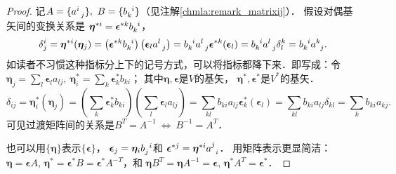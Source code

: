\begin{proof}
    记$A=\{a^{i}_{\hphantom{a} j}\},\ B=\{b^{\hphantom{a} i} _k\}$（见注解\ref{chmla:remark_matrixij}）．
    假设对偶基矢间的变换关系是
    $\boldsymbol{\eta}^{*i} = \boldsymbol{\epsilon}^{*k} b^{\hphantom{a} i} _k $，
    \begin{equation}\label{chmla:eqn_inv-cov-base}
        \delta^i _j = \boldsymbol{\eta}^{*i}(\boldsymbol{\eta}_j) =
        \left( \boldsymbol{\epsilon}^{*k} b^{\hphantom{a} i} _k \right)
        \left( \boldsymbol{\epsilon}_l a^{l}_{\hphantom{a} j}  \right) =
        b^{\hphantom{a} i} _k   a^{l}_{\hphantom{a} j}
        \boldsymbol{\epsilon}^{*k}(\boldsymbol{\epsilon}_l) =
        b^{\hphantom{a} i} _k   a^{l}_{\hphantom{a} j}  \delta^k_l =
        b^{\hphantom{a} i} _k   a^{k}_{\hphantom{a} j}.
    \end{equation}
    如读者不习惯这种指标分上下的记号方式，可以将指标都降下来．即写成：令
    $\boldsymbol{\eta}_j = \sum_{l}\boldsymbol{\epsilon}_l a_{lj},\
    \boldsymbol{\eta}^{*}_i =\sum_{k} \boldsymbol{\epsilon}^{*}_k b_{ki}$；
    其中$\boldsymbol{\eta},\boldsymbol{\epsilon}$是$V$的基矢，
    $\boldsymbol{\eta}^{*},\boldsymbol{\epsilon}^{*}$是$V^*$的基矢．
\setlength{\mathindent}{0em}
    \begin{equation*}
        \delta_{ij} = \boldsymbol{\eta}^{*}_i(\boldsymbol{\eta}_j) =
        \left( \sum_{k} \boldsymbol{\epsilon}^{*}_k b_{ki} \right)
        \left( \sum_{l} \boldsymbol{\epsilon}_l a_{lj} \right) =
        \sum_{kl} b_{ki}  a_{lj}
        \boldsymbol{\epsilon}^{*}_k(\boldsymbol{\epsilon}_l) =
        \sum_{kl} b_{ki}  a_{lj}  \delta_{kl} =
        \sum_{k} b_{ki}  a_{kj}.
    \end{equation*}\setlength{\mathindent}{2em}
    可见过渡矩阵间的关系是$B^T=A^{-1} \ \Leftrightarrow \ B^{-1} = A^T$．

    也可以用$\{\boldsymbol{\eta}\}$表示$\{\boldsymbol{\epsilon}\}$，
    $\boldsymbol{\epsilon}_j=\boldsymbol{\eta}_i b_j ^{\hphantom{a} i}$和
    $\boldsymbol{\epsilon}^{*j}=\boldsymbol{\eta}^{*i} a_{\hphantom{a} i} ^{j}$．
    用矩阵表示更显简洁：$\boldsymbol{\eta}=\boldsymbol{\epsilon}A$,
    $\boldsymbol{\eta}^{*}=\boldsymbol{\epsilon}^{*}B=\boldsymbol{\epsilon}^{*}A^{-T}$，和
    $\boldsymbol{\eta}B^T=\boldsymbol{\eta}A^{-1}=\boldsymbol{\epsilon}$,
    $\boldsymbol{\eta}^{*}A^T=\boldsymbol{\epsilon}^{*}$．
\end{proof}

